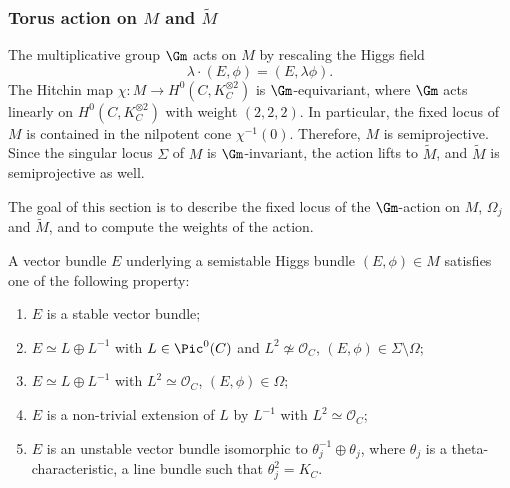 \subsubsection{Torus action on $M$ and $\widetilde{M}$}\label{sec:torusaction}
The multiplicative group $\Gm$ acts on $M$ by rescaling the Higgs field\vspace*{-3pt}
\[
\lambda \cdot (E, \phi)=(E, \lambda \phi).
\]
The Hitchin map $\chi\colon M \to H^0(C, K_C^{\otimes 2})$ is $\Gm$\nobreakdash-equivariant, where $\Gm$ acts linearly on $H^0(C, K_C^{\otimes 2})$ with weight $(2,2,2)$. In particular, the fixed locus of $M$ is contained in the nilpotent cone $\chi^{-1}(0)$. Therefore, $M$ is semiprojective. Since the singular locus $\Sigma$ of $M$ is $\Gm$\nobreakdash-invariant, the action lifts to $\widetilde{M}$, and $\widetilde{M}$ is semiprojective as well.

The goal of this section is to describe the fixed locus of the $\Gm$\nobreakdash-action on $M$, $\Omega_j$ and $\widetilde{M}$, and to compute the weights of the action.

\begin{prop}\label{Hitchin:classificationvb}
A vector bundle $E$ underlying a semistable Higgs bundle $(E, \phi) \in M$ satisfies one of the following property:
\begin{enumerate}
\item $E$ is a stable vector bundle;
\item $E \simeq L \oplus L^{-1}$ with $L\in \Pic^0(C)$ and $L^2 \not\simeq \mathcal{O}_C$, \ie $(E, \phi) \in \Sigma \setminus \Omega$;
\item $E \simeq L \oplus L^{-1}$ with $L^2 \simeq \mathcal{O}_C$, \ie $(E, \phi) \in \Omega$;
\item\label{item:nontrivialextension} $E$ is a non-trivial extension of $L$ by $L^{-1}$ with $L^2 \simeq \mathcal{O}_C$;
\item $E$ is an unstable vector bundle isomorphic to $\theta^{-1}_j \oplus \theta_j$, where $\theta_j$ is a theta-characteristic, \ie a line bundle such that $\theta_j^2=K_C$.
\end{enumerate}
\end{prop}

